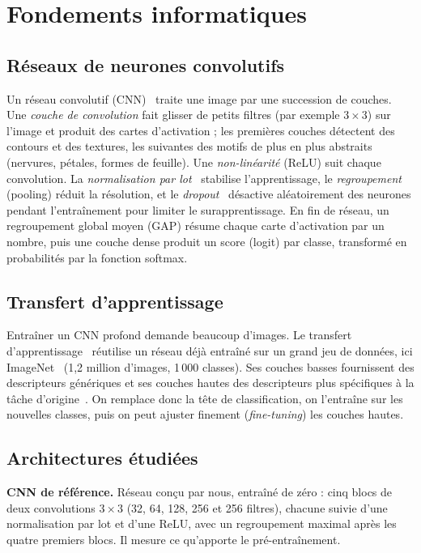 \documentclass[conference]{IEEEtran}
\begin{document}
\section{Fondements informatiques}\label{sec:bg-info}
\subsection{Réseaux de neurones convolutifs}
Un réseau convolutif (CNN)~\cite{lecun1998} traite une image par une succession de couches. Une \emph{couche de convolution} fait glisser de petits filtres (par exemple $3{\times}3$) sur l'image et produit des cartes d'activation ; les premières couches détectent des contours et des textures, les suivantes des motifs de plus en plus abstraits (nervures, pétales, formes de feuille). Une \emph{non-linéarité} (ReLU) suit chaque convolution. La \emph{normalisation par lot}~\cite{ioffe2015} stabilise l'apprentissage, le \emph{regroupement} (pooling) réduit la résolution, et le \emph{dropout}~\cite{srivastava2014} désactive aléatoirement des neurones pendant l'entraînement pour limiter le surapprentissage. En fin de réseau, un regroupement global moyen (GAP) résume chaque carte d'activation par un nombre, puis une couche dense produit un score (logit) par classe, transformé en probabilités par la fonction softmax.

\subsection{Transfert d'apprentissage}
Entraîner un CNN profond demande beaucoup d'images. Le transfert d'apprentissage~\cite{pan2010} réutilise un réseau déjà entraîné sur un grand jeu de données, ici ImageNet~\cite{deng2009} (1,2 million d'images, 1\,000 classes). Ses couches basses fournissent des descripteurs génériques et ses couches hautes des descripteurs plus spécifiques à la tâche d'origine~\cite{yosinski2014}. On remplace donc la tête de classification, on l'entraîne sur les nouvelles classes, puis on peut ajuster finement (\emph{fine-tuning}) les couches hautes.

\subsection{Architectures étudiées}
\textbf{CNN de référence.} Réseau conçu par nous, entraîné de zéro : cinq blocs de deux convolutions $3{\times}3$ (32, 64, 128, 256 et 256 filtres), chacune suivie d'une normalisation par lot et d'une ReLU, avec un regroupement maximal après les quatre premiers blocs. Il mesure ce qu'apporte le pré-entraînement.
\end{document}
